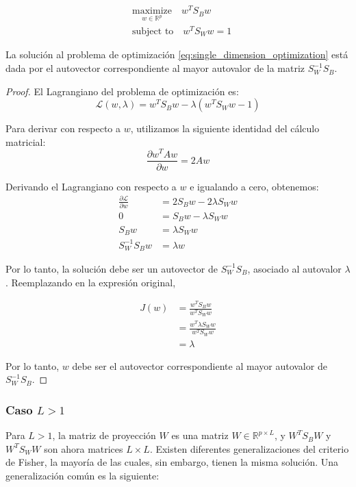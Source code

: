 \begin{align} \label{eq:single_dimension_optimization}
& \underset{w \in \mathbb{R}^p}{\mathrm{maximize}} \quad w^T S_B w \\
& \text{subject to} \quad w^T S_W w = 1 \nonumber
\end{align}

\begin{theorem}
La solución al problema de optimización \ref{eq:single_dimension_optimization} está dada por el autovector correspondiente al mayor autovalor de la matriz $S_W^{-1} S_B$.
\end{theorem}

\begin{proof}
El Lagrangiano del problema de optimización es:
\[
\mathcal{L}(w, \lambda) = w^T S_B w - \lambda(w^T S_W w - 1)
\]

Para derivar con respecto a $w$, utilizamos la siguiente identidad del cálculo matricial:
\[
\frac{\partial w^T A w}{\partial w} = 2Aw
\]

Derivando el Lagrangiano con respecto a $w$ e igualando a cero, obtenemos:
\begin{align*}
\frac{\partial \mathcal{L}}{\partial w} &= 2S_B w - 2\lambda S_W w \\
0 &= S_B w - \lambda S_W w \\
S_B w &= \lambda S_W w \\
S_W^{-1} S_B w &= \lambda w
\end{align*}

Por lo tanto, la solución debe ser un autovector de $S_W^{-1} S_B$, asociado al autovalor $\lambda$. Reemplazando en la expresión original,

\begin{align*}
J(w) &= \frac{w^T S_B w}{w^T S_W w} \\
&= \frac{w^T \lambda S_W w}{w^T S_W w} \\
& = \lambda
\end{align*}

Por lo tanto, $w$ debe ser el autovector correspondiente al mayor autovalor de $S_W^{-1} S_B$.
\end{proof}

\subsubsection{Caso $L>1$}

Para $L>1$, la matriz de proyección $W$ es una matriz $W \in \mathbb{R}^{p \times L}$, y $W^T S_B W$ y $W^T S_W W$ son ahora matrices $L \times L$. Existen diferentes generalizaciones del criterio de Fisher, la mayoría de las cuales, sin embargo, tienen la misma solución. Una generalización común es la siguiente:

